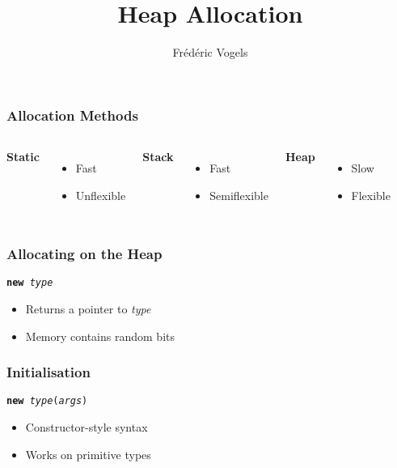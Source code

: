 \documentclass{../ucll-slides}
\title{Heap Allocation}
\author{Fr\'ed\'eric Vogels}
\newenvironment{procontralist}{
  \begingroup
  \newcommand{\pro}{\item[\Checkmark]}
  \newcommand{\con}{\item[\XSolidBrush]}
  \begin{itemize}
  }{
  \end{itemize}
  \endgroup}
\begin{document}
\begin{frame}
  \titlepage
\end{frame}

\begin{frame}
  \frametitle{Allocation Methods}
  \begin{columns}[t]
    \column{3cm}
    \begin{center}
      \textbf{Static}
    \end{center}
    \begin{procontralist}
      \pro Fast
      \con Unflexible
    \end{procontralist}
    \column{3cm}
    \begin{center}
      \textbf{Stack}
    \end{center}
    \begin{procontralist}
      \pro Fast
      \con Semiflexible
    \end{procontralist}
    \column{3cm}
    \begin{center}
      \textbf{Heap}
    \end{center}
    \begin{procontralist}
      \con Slow
      \pro Flexible
    \end{procontralist}
  \end{columns}
\end{frame}

\begin{frame}
  \frametitle{Allocating on the Heap}
  \begin{center}
    \tt {\bfseries new} {\it type}
  \end{center}
  \begin{itemize}
    \item Returns a pointer to {\it type}
    \item Memory contains random bits
  \end{itemize}
  \vskip5mm
\end{frame}

\begin{frame}
  \frametitle{Initialisation}
  \begin{center}
    \tt {\bfseries new} {\it type}({\it args})
  \end{center}
  \begin{itemize}
    \item Constructor-style syntax
    \item Works on primitive types
  \end{itemize}
  \vskip5mm
\end{frame}
\end{document}

